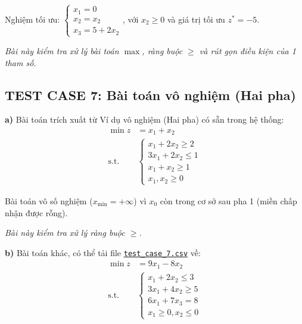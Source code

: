 \documentclass[12pt,a4paper]{article}
\begin{document}
Nghiệm tối ưu: $\begin{cases}
    x_1 = 0\\
    x_2 = x_2\\
    x_3 = 5 + 2x_2
\end{cases}$, với $x_2 \geq 0$ và giá trị tối ưu $z^* = -5$.

\textit{Bài này kiểm tra xử lý bài toán $\max$, ràng buộc $\geq$ và rút gọn điều kiện của 1 tham số.}

\subsection*{TEST CASE 7: Bài toán vô nghiệm (Hai pha)}

\noindent \textbf{a)} Bài toán trích xuất từ \colorbox{green!30}{Ví dụ vô nghiệm (Hai pha)} có sẵn trong hệ thống:
\begin{equation*}
    \begin{aligned}
        \min z &= x_1 + x_2 \\
        \text{s.t.} \quad
        &\begin{cases}
            x_1 + 2x_2 \geq 2 \\
            3x_1 + 2x_2 \leq 1 \\
            x_1 + x_2 \geq 1 \\
            x_1, x_2 \geq 0
        \end{cases}
    \end{aligned}
\end{equation*}

Bài toán vô số nghiệm ($x_{\min} = + \infty$) vì $x_0$ còn trong cơ sở sau pha 1 (miền chấp nhận được rỗng).

\textit{Bài này kiểm tra xử lý ràng buộc $\geq$.}

\noindent \textbf{b)} Bài toán khác, có thể tải file \href{https://drive.google.com/uc?export=download&id=19AbIuvdUcsyOVT9u4zPvYWzQ_VboDXlr}{\texttt{test\_case\_7.csv}} về:
\begin{equation*}
    \begin{aligned}
        \min z &= 9x_1 - 8x_2 \\
        \text{s.t.} \quad
        &\begin{cases}
            x_1 + 2x_2 \leq 3 \\
            3x_1 + 4x_2 \geq 5 \\
            6x_1 + 7x_3 = 8 \\
            x_1 \geq 0, x_2 \leq 0
        \end{cases}
    \end{aligned}
\end{equation*}
\end{document}
